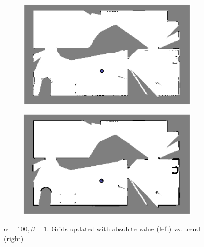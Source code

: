 \documentclass{article} %
\begin{document}
\begin{figure}[hbt]
  \centering
  \begin{subfigure}[b]{0.49\textwidth}
    \centering
    \includegraphics[width=\textwidth]{ass2_q1_a100b1.png}
  \end{subfigure}
  \hfill
  \begin{subfigure}[b]{0.49\textwidth}
    \centering
    \includegraphics[width=\textwidth]{ass2_q1_a100b1_post.png}
  \end{subfigure}
\caption{$\alpha = 100, \beta = 1$. Grids updated with absolute value (left) vs. trend (right)}
\label{fig:q1_a100}
\end{figure}
\end{document}
